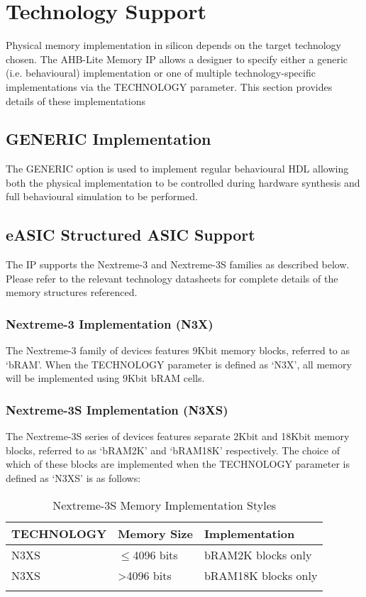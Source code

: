 \chapter{Technology Support}\label{technology-support}

Physical memory implementation in silicon depends on the target
technology chosen. The AHB-Lite Memory IP allows a designer to
specify either a generic (i.e. behavioural) implementation or one 
of multiple technology-specific implementations via the TECHNOLOGY 
parameter. This section provides details of these implementations

 \section{GENERIC Implementation}\label{generic-implementation}

The GENERIC option is used to implement regular behavioural HDL allowing
both the physical implementation to be controlled during hardware
synthesis and full behavioural simulation to be performed.

 \section{eASIC Structured ASIC
Support}\label{easic-structured-asic-support}

The IP supports the Nextreme-3 and Nextreme-3S families as described
below. Please refer to the relevant technology datasheets for complete
details of the memory structures referenced.

 \subsection{Nextreme-3 Implementation (N3X)} \label{nextreme-3-implementation-n3x}

The Nextreme-3 family of devices features 9Kbit memory blocks, referred
to as `bRAM'. When the TECHNOLOGY parameter is defined as `N3X', all
memory will be implemented using 9Kbit bRAM cells.

 \subsection{Nextreme-3S Implementation (N3XS)} \label{nextreme-3s-implementation-n3xs}

The Nextreme-3S series of devices features separate 2Kbit and 18Kbit
memory blocks, referred to as `bRAM2K' and `bRAM18K' respectively. The
choice of which of these blocks are implemented when the TECHNOLOGY
parameter is defined as `N3XS' is as follows:

\begin{longtable}[]{@{}lll@{}}
	\toprule
	TECHNOLOGY & Memory Size & Implementation\tabularnewline
	\midrule
	\endhead
	N3XS & $\leqslant$4096 bits & bRAM2K blocks only\tabularnewline
	N3XS & \textgreater{}4096 bits & bRAM18K blocks only\tabularnewline
	\bottomrule
	\caption{Nextreme-3S Memory Implementation Styles}
\end{longtable}